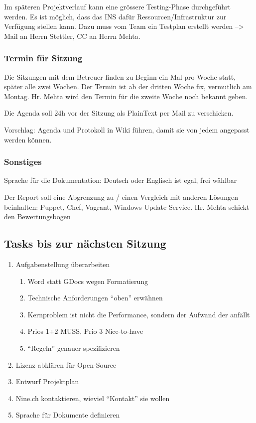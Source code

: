 \documentclass[class=scrbook,crop=false]{standalone}
\begin{document}
    Im späteren Projektverlauf kann eine grössere Testing-Phase durchgeführt werden. Es ist möglich, dass das INS dafür Ressourcen/Infrastruktur zur Verfügung stellen kann. Dazu muss vom Team ein Testplan erstellt werden --> Mail an Herrn Stettler, CC an Herrn Mehta.

    \subsubsection*{Termin für Sitzung}

    Die Sitzungen mit dem Betreuer finden zu Beginn ein Mal pro Woche statt, später alle zwei Wochen. Der Termin ist ab der dritten Woche fix, vermutlich am Montag. Hr. Mehta wird den Termin für die zweite Woche noch bekannt geben.

    Die Agenda soll 24h vor der Sitzung als PlainText per Mail zu verschicken.

    Vorschlag: Agenda und Protokoll in Wiki führen, damit sie von jedem angepasst werden können.


	\subsubsection*{Sonstiges}
	
	Sprache für die Dokumentation: Deutsch oder Englisch ist egal, frei wählbar
	
Der Report soll eine Abgrenzung zu / einen Vergleich mit anderen Lösungen beinhalten: Puppet, Chef, Vagrant, Windows Update Service.
Hr. Mehta schickt den Bewertungsbogen

    \subsection*{Tasks bis zur nächsten Sitzung}
    
    \begin{enumerate}
        \item Aufgabenstellung überarbeiten
        \begin{enumerate}
            \item Word statt GDocs wegen Formatierung
            \item Technische Anforderungen “oben” erwähnen
            \item Kernproblem ist nicht die Performance, sondern der Aufwand der anfällt
            \item Prios 1+2 MUSS, Prio 3 Nice-to-have
            \item “Regeln” genauer spezifizieren
        \end{enumerate}
        \item Lizenz abklären für Open-Source
        \item Entwurf Projektplan
        \item Nine.ch kontaktieren, wieviel “Kontakt” sie wollen
        \item Sprache für Dokumente definieren
    \end{enumerate}
\end{document}
